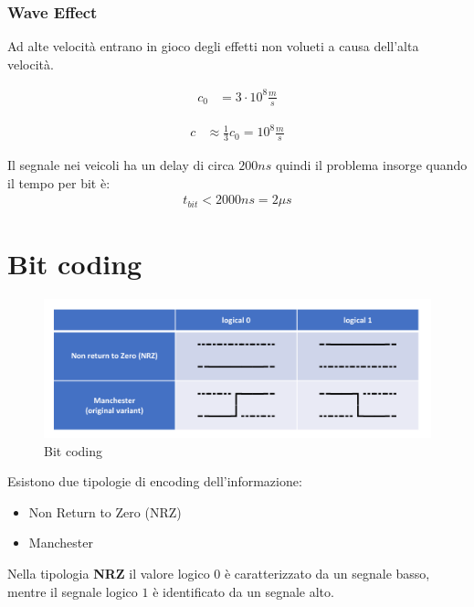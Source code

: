 \subsubsection{Wave Effect}
Ad alte velocità entrano in gioco degli effetti non volueti a causa dell'alta velocità.

\begin{align}
  c_0 &= 3 \cdot 10^8 \frac{m}{s}
  \label{eq:velocita_luce}
\end{align}

\begin{align}
  c &\approx \frac{1}{3} c_0 = 10^8 \frac{m}{s}
  \label{eq:velocita_segale_bus}
\end{align}

Il segnale nei veicoli ha un delay di circa $200ns$ quindi il problema insorge quando il tempo per bit è:
\begin{align}
  t_{bit} < 2000ns = 2 \mu s
\end{align}


\section{Bit coding}
\begin{figure}[!ht]
  \begin{adjustbox}{width=0.5\columnwidth, center}
    \includegraphics{images/bit_coding.png}
  \end{adjustbox}
  \caption{Bit coding}
  \label{fig:bit_coding}
\end{figure}

Esistono due tipologie di encoding dell'informazione:
\begin{itemize}
  \item Non Return to Zero (NRZ)
  \item Manchester
\end{itemize}

Nella tipologia \textbf{NRZ} il valore logico $0$ è caratterizzato da un segnale basso, mentre il segnale logico $1$ è identificato da un segnale alto.

